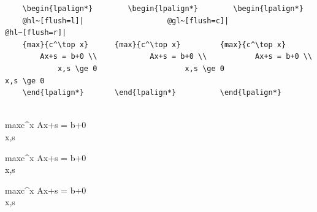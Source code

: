 \documentclass{article}
\begin{document}
\begin{tcolorbox}
	\begin{Verbatim}
	\begin{lpalign*}		\begin{lpalign*}		\begin{lpalign*}
	@hl~[flush=l]|					 @gl~[flush=c]|					 @hl~[flush=r]|
	{max}{c^\top x}		 {max}{c^\top x}		 {max}{c^\top x}
		Ax+s = b+0 \\			 Ax+s = b+0 \\			 Ax+s = b+0 \\
			x,s \ge 0					 x,s \ge 0 					 x,s \ge 0 
	\end{lpalign*} 		 \end{lpalign*} 		 \end{lpalign*} 
	
	\end{Verbatim}
\tcblower
\begin{minipage}{0.32\textwidth}
	\begin{lpalign*}[flush=l]{max}{c^\top x}
    Ax+s = b+0 \\
       x,s  
  \end{lpalign*} 
\end{minipage}\hfill
\begin{minipage}{0.32\textwidth}
	\begin{lpalign*}[flush=c]{max}{c^\top x}
    Ax+s = b+0 \\
       x,s  
  \end{lpalign*} 
\end{minipage}\hfill
\begin{minipage}{0.32\textwidth}
	\begin{lpalign*}[flush=r]{max}{c^\top x}
    Ax+s = b+0 \\
       x,s  
  \end{lpalign*} 
\end{minipage}
\end{tcolorbox}
\end{document}

